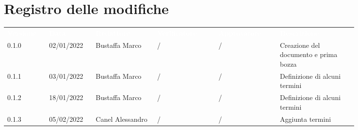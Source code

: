 \section*{Registro delle modifiche}

{\renewcommand{\arraystretch}{1.5}
\scriptsize
\begin{tabular}{p{0.10\linewidth}p{0.10\linewidth}p{0.15\linewidth}p{0.15\linewidth}p{0.15\linewidth}p{0.19\linewidth}}
	\rowcolor[RGB]{33, 73, 50}
	\textcolor{white}{\textbf{Versione}} & \textcolor{white}{\textbf{Data}} &
	\textcolor{white}{\textbf{Redattore}} & \textcolor{white}{\textbf{Verificatore}} &
	\textcolor{white}{\textbf{Approvatore}} & \textcolor{white}{\textbf{Descrizione}}\\
	\rowcolor[RGB]{216, 235, 171}
	0.1.0 & 02/01/2022 & Bustaffa Marco & / &/& Creazione del documento e prima bozza\\
	\rowcolor[RGB]{233, 245, 206}
	0.1.1 & 03/01/2022 & Bustaffa Marco & / &/& Definizione di alcuni termini\\
	\rowcolor[RGB]{216, 235, 171}
	0.1.2 & 18/01/2022 & Bustaffa Marco & / &/& Definizione di alcuni termini\\
	\rowcolor[RGB]{233, 245, 206}
	0.1.3 & 05/02/2022 & Canel Alessandro & / &/& Aggiunta termini\\
\end{tabular}
}
